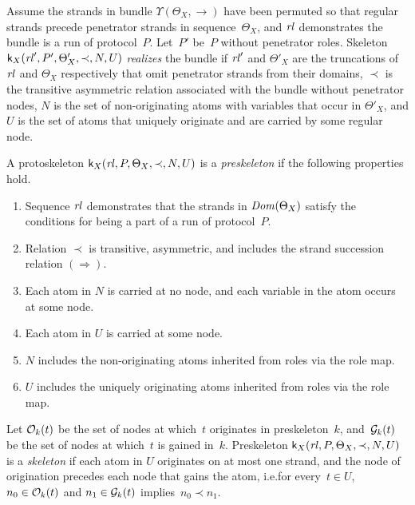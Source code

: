 \documentclass[12pt]{article}
\theoremstyle{definition}
\newcommand{\sdom}{\fn{Dom}}
\newcommand{\skel}{\mathsf{k}}
\newcommand{\rl}{\fn{rl}}
\begin{document}
Assume the strands in bundle $\Upsilon(\Theta_X,\to)$ have been
permuted so that regular strands precede penetrator strands in
sequence~$\Theta_X$, and $\rl$ demonstrates the bundle is a run of
protocol~$P$.  Let~$P'$ be~$P$ without penetrator roles.
Skeleton $\skel_X(\rl',P',\Theta'_X,\prec,N,U)$
\emph{realizes} the bundle if $\rl'$ and $\Theta'_X$ are the
truncations of $\rl$ and $\Theta_X$ respectively that omit penetrator
strands from their domains, $\prec$ is the transitive asymmetric
relation associated with the bundle without penetrator nodes, $N$ is
the set of non-originating atoms with variables that occur in
$\Theta'_X$, and $U$ is the set of atoms that uniquely originate and
are carried by some regular node.

A protoskeleton $\skel_X(\rl,P,\Theta_X,\prec,N,U)$ is a
\emph{preskeleton} if the following properties hold.
\begin{enumerate}
\item Sequence $\rl$ demonstrates that the strands in $\sdom(\Theta_X)$
  satisfy the conditions for being a part of a run of protocol~$P$.
\item Relation $\prec$ is transitive, asymmetric, and includes the
  strand succession relation $(\Rightarrow)$.
\item Each atom in $N$ is carried at no node, and each variable
  in the atom occurs at some node.
\item Each atom in $U$ is carried at some node.
\item $N$ includes the non-originating atoms inherited from roles via
  the role map.
\item $U$ includes the uniquely originating atoms inherited from roles via
  the role map.
\end{enumerate}

\begin{sloppypar}
Let $\mathcal{O}_k(t)$ be the set of nodes at which~$t$ originates in
preskeleton~$k$, and~$\mathcal{G}_k(t)$ be the set of nodes at which~$t$ is
gained in~$k$.  Preskeleton $\skel_X(\rl,P,\Theta_X,\prec,N,U)$ is a
\emph{skeleton} if each atom in $U$ originates on at most one strand,
and the node of origination precedes each node that gains the atom,
i.e.\@ for every~$t\in U$, $n_0\in\mathcal{O}_k(t)$ and $n_1\in\mathcal{G}_k(t)$
implies~$n_0\prec n_1$.
\end{sloppypar}
\end{document}
